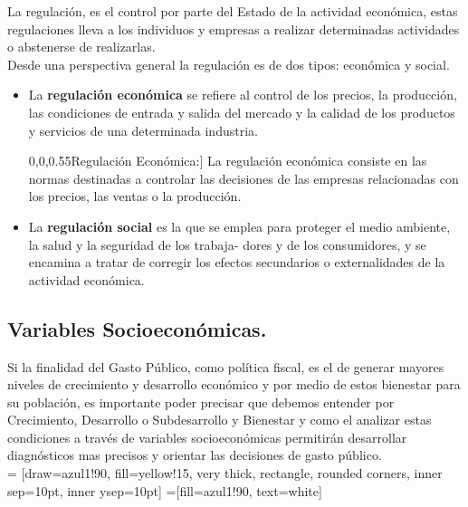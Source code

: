 	\begin{cajaejercicios1}[Regulación]
		La regulación, es el control por parte del Estado de la actividad económica, estas regulaciones lleva a los individuos y empresas a realizar determinadas actividades o abstenerse de realizarlas.\\
		
		Desde una perspectiva general la regulación es de dos tipos: económica y social. 
		\begin{itemize}
			\item La \textbf{regulación económica} se refiere al control de los precios, la producción, las condiciones de entrada y salida del mercado y la calidad de los	productos y servicios de una determinada industria.\\
			
			\begin{definicion}[\textcolor[rgb]{0,0,0.55}{Regulación Económica:}]
				La regulación económica consiste en las normas destinadas a controlar las decisiones de las empresas relacionadas con los precios, las ventas
				o la producción.
			\end{definicion}

			
			\item La \textbf{regulación social} es la que se emplea para proteger
			el medio ambiente, la salud y la seguridad de los trabaja-
			dores y de los consumidores, y se encamina a tratar de
			corregir los efectos secundarios o externalidades de la
			actividad económica.
			 
		\end{itemize}
	\end{cajaejercicios1}
\subsection{{\large Variables Socioeconómicas.}}
Si la finalidad del Gasto Público, como política fiscal, es el de generar mayores niveles de crecimiento y desarrollo económico y por medio de estos bienestar para su población, es importante poder precisar que debemos entender por Crecimiento, Desarrollo o Subdesarrollo y Bienestar y como el analizar estas condiciones a través de variables socioeconómicas permitirán desarrollar diagnósticos mas precisos y orientar las decisiones de gasto público.\\

 = [draw=azul1!90, fill=yellow!15, very thick,
rectangle, rounded corners, inner sep=10pt, inner ysep=10pt]
 =[fill=azul1!90, text=white]

